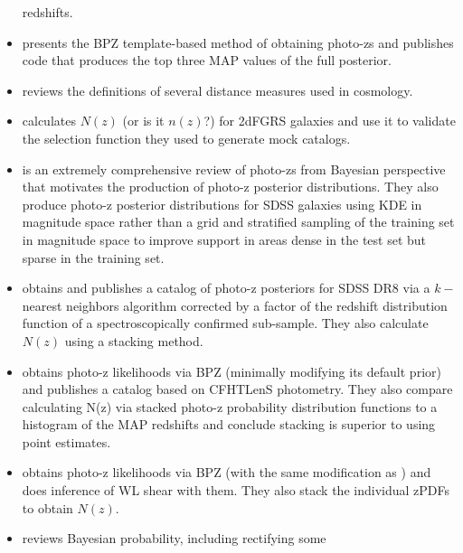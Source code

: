 \documentclass[preprint]{aastex}
\begin{document}
\begin{itemize}
redshifts.
\item \citet{ben98} presents the BPZ template-based method of obtaining 
photo-zs and publishes code that produces the top three MAP values of the full 
posterior.  
\item \citet{hog99} reviews the definitions of several distance measures used 
in cosmology.
\item \citet{nor01} calculates $N(z)$ (or is it $n(z)$?) for 2dFGRS galaxies 
and use it to validate the selection function they used to generate mock 
catalogs.
\item \citet{bud08} is an extremely comprehensive review of photo-zs from 
Bayesian perspective that motivates the production of photo-z posterior 
distributions. They also produce photo-z posterior distributions for SDSS 
galaxies using KDE in magnitude space rather than a grid and stratified 
sampling of the training set in magnitude space to improve support in areas 
dense in the test set but sparse in the training set.
\item \citet{she11} obtains and publishes a catalog of photo-z posteriors for 
SDSS DR8 via a $k-$ nearest neighbors algorithm corrected by a factor of the 
redshift distribution function of a spectroscopically confirmed sub-sample.  
They also calculate $N(z)$ using a stacking method.
\item \citet{hil11} obtains photo-z likelihoods via BPZ (minimally modifying 
its default prior) and publishes a catalog based on CFHTLenS photometry.  They 
also compare calculating N(z) via stacked photo-z probability distribution 
functions to a histogram of the MAP redshifts and conclude stacking is superior 
to using point estimates.
\item \citet{kel12} obtains photo-z likelihoods via BPZ (with the same 
modification as \citet{hil11}) and does inference of WL shear with them.  They 
also stack the individual zPDFs to obtain $N(z)$.
\item \citet{hog12} reviews Bayesian probability, including rectifying some 

\end{itemize}
\end{document}

